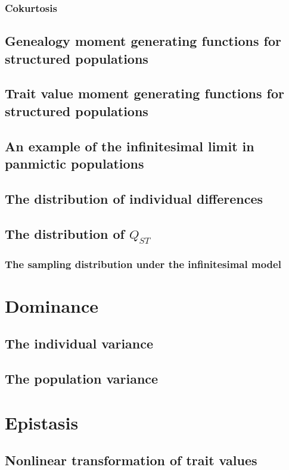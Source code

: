 \documentclass{article}
\begin{document}
\subsubsection{Cokurtosis}

\subsection{Genealogy moment generating functions for structured populations}

\subsection{Trait value moment generating functions for structured populations}

\subsection{An example of the infinitesimal limit in panmictic populations}

\subsection{The distribution of individual differences}

\subsection{The distribution of $Q_{ST}$}

\subsubsection{The sampling distribution under the infinitesimal model}

\section{Dominance}
\subsection{The individual variance}

\subsection{The population variance}

\section{Epistasis}
\subsection{Nonlinear transformation of trait values}

\end{document}
